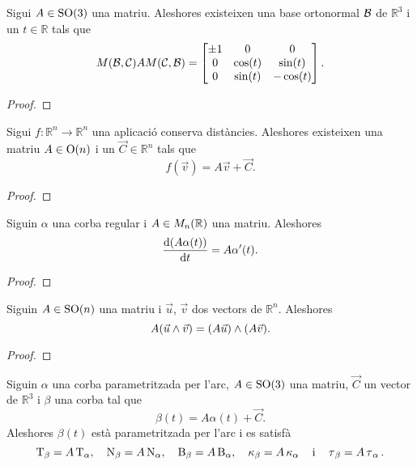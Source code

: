 \documentclass[../Apunts.tex]{subfiles}
\begin{document}
	\begin{proposition}
		Sigui \(A\in\mathrm{SO}(3)\) una matriu. Aleshores existeixen una base ortonormal \(\mathcal{B}\) de \(\mathbb{R}^{3}\) i un \(t\in\mathbb{R}\) tals que
		\[M(\mathcal{B},\mathcal{C})AM(\mathcal{C},\mathcal{B})=\begin{bmatrix}
			\pm1 & 0 & 0 \\
			0 & \cos(t) & \sin(t) \\
			0 & \sin(t) & -\cos(t)
		\end{bmatrix}.\]
	\end{proposition}
	\begin{proof}
	\end{proof}
	\begin{proposition}
		\label{prop:forma matricial de les aplicacions que conserven distàncies}
		Sigui \(f\colon\mathbb{R}^{n}\longrightarrow\mathbb{R}^{n}\) una aplicació conserva distàncies. Aleshores existeixen una matriu \(A\in\mathrm{O}(n)\) i un \(\vec{C}\in\mathbb{R}^{n}\) tals que
		\[f(\vec{v})=A\vec{v}+\vec{C}.\]
	\end{proposition}
	\begin{proof}
	\end{proof}
	\begin{proposition}
		\label{prop:derivada del producte d'una matriu per una corba}
		Siguin \(\alpha\) una corba regular i \(A\in M_{n}(\mathbb{R})\) una matriu. Aleshores
		\[\frac{\mathop{}\!\mathrm{d}(A\alpha(t))}{\mathop{}\!\mathrm{d} t}=A\alpha'(t).\]
	\end{proposition}
	\begin{proof}
	\end{proof}
	\begin{proposition}
		\label{prop:les matrius especials ortogonals conserven el producte vectorial}
		Siguin \(A\in\mathrm{SO}(n)\) una matriu i \(\vec{u}\), \(\vec{v}\) dos vectors de \(\mathbb{R}^{n}\). Aleshores
		\[A(\vec{u}\mathbin{\wedge}\vec{v})=(A\vec{u})\mathbin{\wedge}(A\vec{v}).\]
	\end{proposition}
	\begin{proof}
	\end{proof}
	\begin{corollary}
		\label{cor:una corba parametritzada per l'arc i la seva imatge per una aplicació que conserva les distàncies són equivalents}
		Siguin \(\alpha\) una corba parametritzada per l'arc, \(A\in\mathrm{SO}(3)\) una matriu, \(\vec{C}\) un vector de \(\mathbb{R}^{3}\) i \(\beta\) una corba tal que
		\[\beta(t)=A\alpha(t)+\vec{C}.\]
		Aleshores \(\beta(t)\) està parametritzada per l'arc i es satisfà
		\[\operatorname{T}_{\beta}=A\operatorname{T}_{\alpha},\quad\operatorname{N}_{\beta}=A\operatorname{N}_{\alpha},\quad\operatorname{B}_{\beta}=A\operatorname{B}_{\alpha},\quad\operatorname{\kappa}_{\beta}=A\operatorname{\kappa}_{\alpha}\quad\text{i}\quad\operatorname{\tau}_{\beta}=A\operatorname{\tau}_{\alpha}.\]
	\end{corollary}
\end{document}

